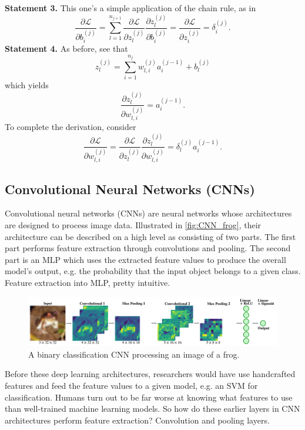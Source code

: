 \documentclass[11pt]{article}
\begin{document}
\vspace{10pt}
\noindent\textbf{Statement 3.} This one's a simple application of the chain rule, as in
$$
\frac{\partial\mathcal{L}}{\partial b_i^{(j)}}
=
\sum_{l=1}^{n_{j+1}}\frac{\partial\mathcal{L}}{\partial z_l^{(j)}}\frac{\partial z_l^{(j)}}{\partial b_i^{(j)}}
=
\frac{\partial\mathcal{L}}{\partial z_i^{(j)}}
=
\delta_i^{(j)}.
$$
\textbf{Statement 4.} As before, see that
$$
z_l^{(j)}
=
\sum_{i=1}^{n_j}w_{l,i}^{(j)}a_i^{(j-1)}+b_l^{(j)}
$$
which yields
$$
\frac{\partial z_l^{(j)}}{\partial w_{l,i}^{(j)}}
=
a_i^{(j-1)}.
$$
To complete the derivation, consider
$$
\frac{\partial\mathcal{L}}{\partial w_{l,i}^{(j)}}
=
\frac{\partial\mathcal{L}}{\partial z_l^{(j)}}\frac{\partial z_l^{(j)}}{\partial w_{l,i}^{(j)}}
=
\delta_l^{(j)}a_i^{(j-1)}.
$$

\subsection{Convolutional Neural Networks (CNNs)}
\label{subsec:conv_neural_networks}
Convolutional neural networks (CNNs) are neural networks whose architectures are designed to process image data. Illustrated in \autoref{fig:CNN_frog}, their architecture can be described on a high level as consisting of two parts. The first part performs feature extraction through convolutions and pooling. The second part is an MLP which uses the extracted feature values to produce the overall model's output, e.g. the probability that the input object belongs to a given class. Feature extraction into MLP, pretty intuitive.

\begin{figure}[t]
    \centering
    \includegraphics[width=1\textwidth]{./figures/neural_nets/CNN_frog.pdf}
    \caption{A binary classification CNN processing an image of a frog.}
    \label{fig:CNN_frog}
\end{figure}

Before these deep learning architectures, researchers would have use handcrafted features and feed the feature values to a given model, e.g. an SVM for classification. Humans turn out to be far worse at knowing what features to use than well-trained machine learning models. So how do these earlier layers in CNN architectures perform feature extraction? Convolution and pooling layers. 
\end{document}
